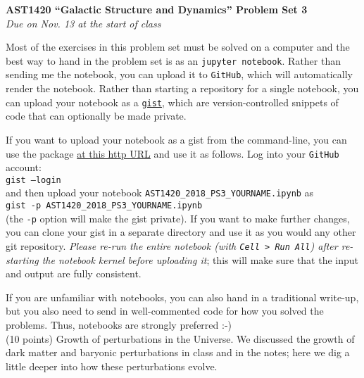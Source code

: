 \documentclass[12pt]{article}
\begin{document}
\begin{center}
{\bf \LARGE AST1420 ``Galactic Structure and Dynamics'' Problem Set 3}\\[7pt]
\emph{Due on Nov. 13 at the start of class}\\[7pt]
\end{center}

Most of the exercises in this problem set must be solved on a computer
and the best way to hand in the problem set is as an \texttt{jupyter
  notebook}. Rather than sending me the notebook, you can upload it to
\texttt{GitHub}, which will automatically render the notebook. Rather
than starting a repository for a single notebook, you can upload your
notebook as a \texttt{\href{https://gist.github.com/}{gist}}, which
are version-controlled snippets of code that can optionally be made
private.

If you want to upload your notebook as a gist from the command-line,
you can use the package \href{http://github.com/defunkt/gist}{at this
  http URL} and use it as follows. Log into your \texttt{GitHub}
account:\\

\texttt{gist --login}\\

and then upload your notebook
\texttt{AST1420\_2018\_PS3\_YOURNAME.ipynb} as\\

\texttt{gist -p AST1420\_2018\_PS3\_YOURNAME.ipynb}\\

(the \texttt{-p} option will make the gist private). If you want to
make further changes, you can clone your gist in a separate directory
and use it as you would any other git repository. \emph{Please re-run
  the entire notebook (with \texttt{Cell > Run All}) after re-starting
  the notebook kernel before uploading it}; this will make sure that
the input and output are fully consistent. 

If you are unfamiliar with notebooks, you can also hand in a
traditional write-up, but you also need to send in well-commented code
for how you solved the problems. Thus, notebooks are strongly
preferred :-)\\

 (10 points) Growth of perturbations in the
Universe. We discussed the growth of dark matter and baryonic
perturbations in class and in the notes; here we dig a little deeper
into how these perturbations evolve.\\
\end{document}
